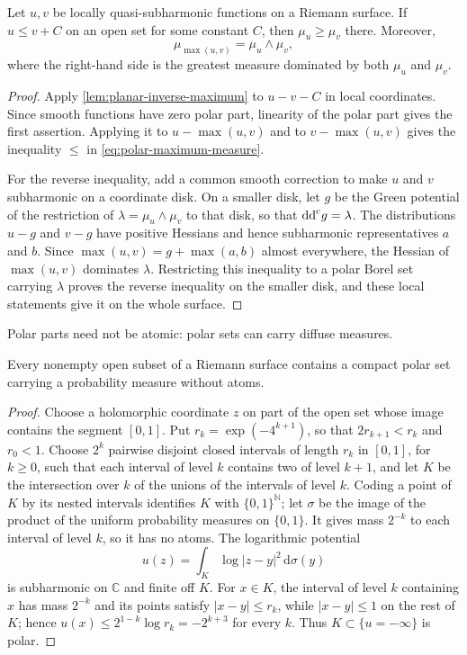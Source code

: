 \begin{corollary}\label{cor:polar-order-maximum}
Let $u,v$ be locally quasi-subharmonic functions on a Riemann surface. If $u\leq v+C$ on an open set for some constant $C$, then $\mu_u\geq\mu_v$ there. Moreover,
\begin{equation}\label{eq:polar-maximum-measure}
 \mu_{\max(u,v)}=\mu_u\wedge\mu_v,
\end{equation}
where the right-hand side is the greatest measure dominated by both $\mu_u$ and $\mu_v$.
\end{corollary}
\begin{proof}
Apply \cref{lem:planar-inverse-maximum} to $u-v-C$ in local coordinates. Since smooth functions have zero polar part, linearity of the polar part gives the first assertion. Applying it to $u-\max(u,v)$ and to $v-\max(u,v)$ gives the inequality $\leq$ in \eqref{eq:polar-maximum-measure}.

For the reverse inequality, add a common smooth correction to make $u$ and $v$ subharmonic on a coordinate disk. On a smaller disk, let $g$ be the Green potential of the restriction of $\lambda=\mu_u\wedge\mu_v$ to that disk, so that $\mathrm{dd}^{\mathrm{c}} g=\lambda$. The distributions $u-g$ and $v-g$ have positive Hessians and hence subharmonic representatives $a$ and $b$. Since $\max(u,v)=g+\max(a,b)$ almost everywhere, the Hessian of $\max(u,v)$ dominates $\lambda$. Restricting this inequality to a polar Borel set carrying $\lambda$ proves the reverse inequality on the smaller disk, and these local statements give it on the whole surface.
\end{proof}

Polar parts need not be atomic: polar sets can carry diffuse measures.

\begin{lemma}\label{lem:polar-cantor-nonatomic-measure}
Every nonempty open subset of a Riemann surface contains a compact polar set carrying a probability measure without atoms.
\end{lemma}
\begin{proof}
Choose a holomorphic coordinate $z$ on part of the open set whose image contains the segment $[0,1]$. Put $r_k=\exp(-4^{k+1})$, so that $2r_{k+1}<r_k$ and $r_0<1$. Choose $2^k$ pairwise disjoint closed intervals of length $r_k$ in $[0,1]$, for $k\geq0$, such that each interval of level $k$ contains two of level $k+1$, and let $K$ be the intersection over $k$ of the unions of the intervals of level $k$. Coding a point of $K$ by its nested intervals identifies $K$ with $\{0,1\}^{\mathbb N}$; let $\sigma$ be the image of the product of the uniform probability measures on $\{0,1\}$. It gives mass $2^{-k}$ to each interval of level $k$, so it has no atoms. The logarithmic potential
\[
 u(z)=\int_K\log|z-y|^2\,\mathrm d\sigma(y)
\]
is subharmonic on $\mathbb C$ and finite off $K$. For $x\in K$, the interval of level $k$ containing $x$ has mass $2^{-k}$ and its points satisfy $|x-y|\leq r_k$, while $|x-y|\leq1$ on the rest of $K$; hence $u(x)\leq2^{1-k}\log r_k=-2^{k+3}$ for every $k$. Thus $K\subset\{u=-\infty\}$ is polar.
\end{proof}

